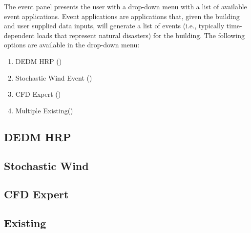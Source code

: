 The event panel presents the user with a drop-down menu with a list of
available event applications. Event applications are applications
that, given the building and user supplied data inputs, will generate
a list of events (i.e., typically time-dependent loads that represent natural disasters) for the building. The following options
are available in the drop-down menu:

\begin{enumerate}
\item DEDM HRP ()
\item Stochastic Wind Event ()
\item CFD Expert ()
\item Multiple Existing()
\end{enumerate}

\subsection{DEDM HRP}
\label{subsec:dedm_hrp}


\subsection{Stochastic Wind}
\label{subsec:stochastic_wind}


\subsection{CFD Expert}
\label{subsec:cfd_expert}


\subsection{Existing}
\label{subsec:multiple_existing}

